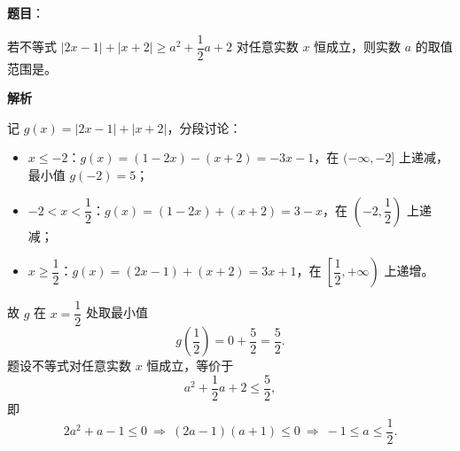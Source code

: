 \begin{answer}

\textbf{题目}：

若不等式 $|2x-1|+|x+2|\geqslant a^2+\dfrac12 a+2$ 对任意实数 $x$ 恒成立，则实数 $a$ 的取值范围是\gkblank{}。

\textbf{解析}

记 $g(x)=|2x-1|+|x+2|$，分段讨论：

\begin{itemize}
\item $x\leqslant-2$：$g(x)=(1-2x)-(x+2)=-3x-1$，在 $(-\infty,-2]$ 上递减，最小值 $g(-2)=5$；
\item $-2<x<\dfrac12$：$g(x)=(1-2x)+(x+2)=3-x$，在 $\left(-2,\dfrac12\right)$ 上递减；
\item $x\geqslant\dfrac12$：$g(x)=(2x-1)+(x+2)=3x+1$，在 $\left[\dfrac12,+\infty\right)$ 上递增。
\end{itemize}

故 $g$ 在 $x=\dfrac12$ 处取最小值
\nopagebreak[4]
\[g\left(\frac12\right)=0+\frac52=\frac52 .\]
题设不等式对任意实数 $x$ 恒成立，等价于
\nopagebreak[4]
\[a^2+\frac12a+2\leqslant\frac52,\]
即
\nopagebreak[4]
\[2a^2+a-1\leqslant0\ \Longrightarrow\ (2a-1)(a+1)\leqslant0\ \Longrightarrow\ -1\leqslant a\leqslant\frac12 .\]


\end{answer}
